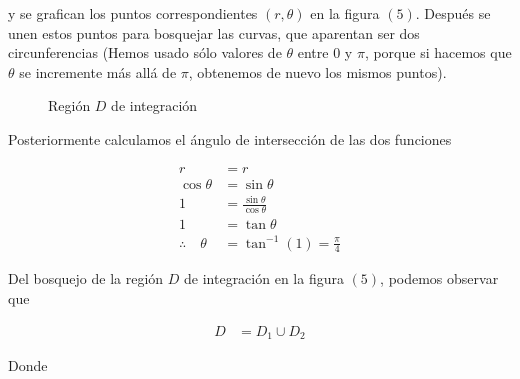 \documentclass[12pt]{exam}
\begin{document}
\begin{questions}
  y se grafican los puntos correspondientes $(r,\theta)$ en la figura $(5)$. Después se unen estos puntos para bosquejar las curvas, que aparentan ser dos circunferencias (Hemos usado sólo valores de $\theta$ entre 0 y $\pi$, porque si hacemos que $\theta$ se incremente más allá de $\pi$, obtenemos de nuevo los mismos puntos).

  \begin{figure}[H]
    \centering
    \label{fig:2}
    \caption{Región $D$ de integración}
  \end{figure}

  Posteriormente calculamos el ángulo de intersección de las dos funciones
  
  \begin{align*}
    r &= r \\
    \cos{\theta} &= \sin{\theta} \\
    1 &= \frac{\sin{\theta}}{\cos{\theta}} \\
    1 &= \tan{\theta} \\
    \therefore \quad \theta &= \tan^{-1}{(1)} = \frac{\pi}{4}
  \end{align*}

  Del bosquejo de la región $D$ de integración en la figura $(5)$, podemos observar que

  \begin{align*}
    D &= D_1 \cup D_2
  \end{align*}

  Donde


\end{questions}
\end{document}
